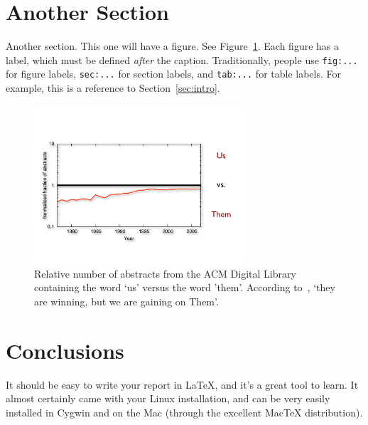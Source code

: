 \documentclass[11pt]{article}
\begin{document}
\section{Another Section}

Another section. This one will have a figure. See
Figure~\ref{fig:us-versus-them}. Each figure has a label, which must be
defined \emph{after} the caption. Traditionally, people use
\texttt{fig:...} for figure labels, \texttt{sec:...} for section
labels, and \texttt{tab:...} for table labels. For example, this is a
reference to Section~\ref{sec:intro}. 

\begin{figure}
\centering
\includegraphics[width=0.7\textwidth]{usthem}
\caption{Relative number of abstracts from the ACM Digital Library
containing the word `us' versus the word 'them'. According
to~\cite{godfrey08}, `they are winning, but we are gaining on Them'. }
\label{fig:us-versus-them}
\end{figure}



\section{Conclusions}

It should be easy to write your report in LaTeX, and it's a great tool
to learn. It almost certainly came with your Linux installation, and
can be very easily installed in Cygwin and on the Mac (through the
excellent MacTeX distribution).




\end{document}
